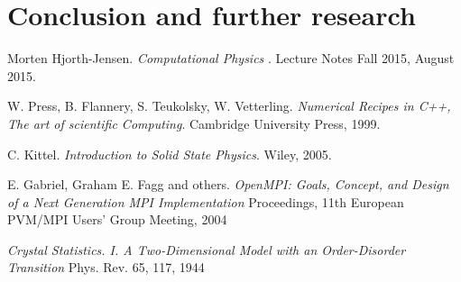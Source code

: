 \documentclass[10pt]{article}
\begin{document}
\clearpage





\section{Conclusion and further research}\label{conc}
\newpage
\begin{thebibliography}{2}
Morten Hjorth-Jensen. 
\textit{Computational Physics
}. 
Lecture Notes Fall 2015, August 2015.

W. Press, B. Flannery, S. Teukolsky, W. Vetterling. 
\textit{Numerical Recipes in C++, The art of scientific Computing}. 
Cambridge University Press, 1999.

C. Kittel. 
\textit{Introduction to Solid State Physics}. 
Wiley, 2005.

E. Gabriel,  Graham E. Fagg and others.
\textit{OpenMPI: Goals, Concept, and Design of a Next Generation MPI Implementation}
Proceedings, 11th European PVM/MPI Users' Group Meeting, 2004


\textit{Crystal Statistics. I. A Two-Dimensional Model with an Order-Disorder Transition}
Phys. Rev. 65, 117, 1944
\end{thebibliography}
\end{document}
